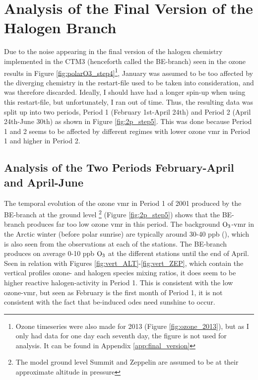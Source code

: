 \section{Analysis of the Final Version of the Halogen Branch}\label{sec:disc_final_Version}

Due to the noise appearing in the final version of the halogen chemistry implemented in the CTM3 (henceforth called the BE-branch) seen in the ozone results in Figure \ref{fig:polarO3_step4}\footnote{Ozone timeseries were also made for 2013 (Figure \ref{fig:ozone_2013}), but as I only had data for one day each seventh day, the figure is not used for analysis. It can be found in Appendix \ref{app:final_version}}, January was assumed to be too affected by the diverging chemistry in the restart-file used to be taken into consideration, and was therefore discarded. Ideally, I should have had a longer spin-up when using this restart-file, but unfortunately, I ran out of time. Thus, the resulting data was split up into two periods, Period 1 (February 1st-April 24th) and Period 2 (April 24th-June 30th) as shown in Figure \ref{fig:2p_step5}. This was done because Period 1 and 2 seems to be affected by different regimes with lower ozone \acrshort{vmr} in Period 1 and higher in Period 2.

\subsection{Analysis of the Two Periods February-April and April-June}\label{sec:disc_twoPeriods}

The temporal evolution of the ozone \acrshort{vmr} in Period 1 of 2001 produced by the BE-branch at the ground level \footnote{The model ground level Summit and Zeppelin are assumed to be at their approximate altitude in pressure} (Figure \ref{fig:2p_step5}) shows that the BE-branch produces far too low ozone \acrshort{vmr} in this period. The background $\mathrm{O_3}$-\acrshort{vmr} in the Arctic winter (before polar sunrise) are typically around 30-40 ppb (\cite{Foster2001}), which is also seen from the observations at each of the stations. The BE-branch produces on average 0-10 ppb $\mathrm{O_3}$ at the different stations until the end of April. Seen in relation with Figures \ref{fig:vert_ALT}-\ref{fig:vert_ZEP}, which contain the vertical profiles ozone- and halogen species mixing ratios, it does seem to be higher reactive halogen-activity in Period 1. This is consistent with the low ozone-\acrshort{vmr}, but seen as February is the first month of Period 1, it is not consistent with the fact that \acrshort{be}-induced \acrshort{ode}s need sunshine to occur. 


